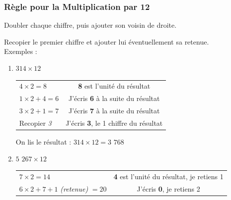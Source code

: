 \documentclass[a4paper, twoside]{article}
\begin{document}
		\vfill

		\newpage





		\subsubsection*{Règle pour la Multiplication par 12}

		Doubler chaque chiffre, puis ajouter son voisin de droite.

		Recopier le premier chiffre et ajouter lui éventuellement sa retenue.\\

		{ \parindent=0.5cm Exemples : }

		\begin{small}
		\begin{enumerate}

			\item $314 \times 12$

			\begin{tabular}{l|c}

				$4 \times 2 = 8$ & \textbf{8} est l'unité du résultat
				
				\tabularnewline
				
				$1 \times 2 + 4 = 6$ & J'écris \textbf{6} à la suite du résultat
				
				\tabularnewline
				
				$3 \times 2 + 1 = 7$ & J'écris \textbf{7} à la suite du résultat
				
				\tabularnewline
				
				Recopier \textit{3} & J'écris \textbf{3}, le 1\up{er} chiffre du résultat

			\end{tabular}
			
			On lis le résultat : {\boldmath $314 \times 12 = 3$ $768$}\\
			
			
			
			

			\item $5$ $267 \times 12$

			\begin{tabular}{l|c}

				$7 \times 2 = 14$ & \textbf{4} est l'unité du résultat, je retiens 1
				
				\tabularnewline
				
				$6 \times 2 + 7 + 1$ \textit{(retenue)} $= 20$ & J'écris \textbf{0}, je retiens 2
				

\end{tabular}
\end{enumerate}
\end{small}
\end{document}
